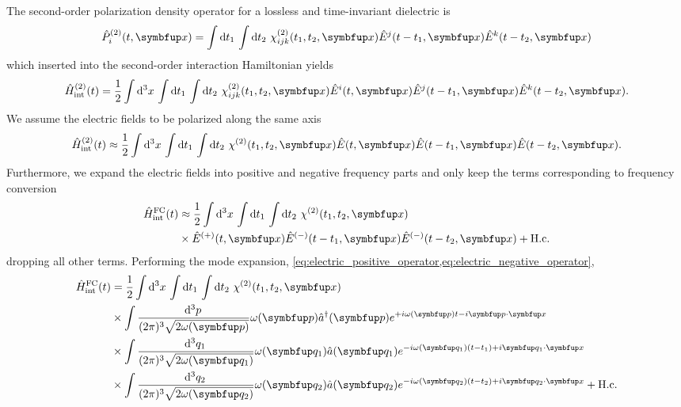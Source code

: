The second-order polarization density operator for a lossless and time-invariant dielectric is
\begin{equation}
	\hat{P}_i^{(2)}(t,\vb{x})
	=
	\int\dd{t_1}
	\int\dd{t_2}
	\chi^{(2)}_{ijk}(t_1,t_2,\vb{x})
	\hat{E}^j(t-t_1,\vb{x})
	\hat{E}^k(t-t_2,\vb{x})
\end{equation}
which inserted into the second-order interaction Hamiltonian yields
\begin{equation}
	\hat{H}_\text{int}^{(2)}(t)
	=
	\frac{1}{2}
	\int\dd[3]{x}
	\int\dd{t_1}
	\int\dd{t_2}
	\chi^{(2)}_{ijk}(t_1,t_2,\vb{x})
	\hat{E}^i(t,\vb{x})
	\hat{E}^j(t-t_1,\vb{x})
	\hat{E}^k(t-t_2,\vb{x})
	.
\end{equation}
We assume the electric fields to be polarized along the same axis
\begin{equation}
	\hat{H}_\text{int}^{(2)}(t)
	\approx
	\frac{1}{2}
	\int\dd[3]{x}
	\int\dd{t_1}
	\int\dd{t_2}
	\chi^{(2)}(t_1,t_2,\vb{x})
	\hat{E}(t,\vb{x})
	\hat{E}(t-t_1,\vb{x})
	\hat{E}(t-t_2,\vb{x})
	.
\end{equation}
Furthermore, we expand the electric fields into positive and negative frequency parts and only keep the terms corresponding to frequency conversion
\begin{equation}
	\begin{split}
		\hat{H}_\text{int}^\text{FC}(t)
		&\approx
		\frac{1}{2}
		\int\dd[3]{x}
		\int\dd{t_1}
		\int\dd{t_2}
		\chi^{(2)}(t_1,t_2,\vb{x})
		\\
		&\times
		\hat{E}^{(+)}(t,\vb{x})
		\hat{E}^{(-)}(t-t_1,\vb{x})
		\hat{E}^{(-)}(t-t_2,\vb{x})
		+
		\text{H.c.}
	\end{split}
\end{equation}
dropping all other terms.
Performing the mode expansion, \cref{eq:electric_positive_operator,eq:electric_negative_operator},
\begin{equation}
	\begin{split}
		\hat{H}_\text{int}^\text{FC}(t)
		&=
		\frac{1}{2}
		\int\dd[3]{x}
		\int\dd{t_1}
		\int\dd{t_2}
		\chi^{(2)}(t_1,t_2,\vb{x})
		\\
		&\times
		\int\frac{\dd[3]{p}}{(2\pi)^3\sqrt{2\omega(\vb{p})}}
		\omega(\vb{p})
		\hat{a}^\dagger(\vb{p})
		e^{+i\omega(\vb{p})t-i\vb{p}\vdot\vb{x}}
		\\
		&\times
		\int\frac{\dd[3]{q_1}}{(2\pi)^3\sqrt{2\omega(\vb{q}_1)}}
		\omega(\vb{q}_1)
		\hat{a}(\vb{q}_1)
		e^{-i\omega(\vb{q}_1)(t-t_1)+i\vb{q}_1\vdot\vb{x}}
		\\
		&\times
		\int\frac{\dd[3]{q_2}}{(2\pi)^3\sqrt{2\omega(\vb{q}_2)}}
		\omega(\vb{q}_2)
		\hat{a}(\vb{q}_2)
		e^{-i\omega(\vb{q}_2)(t-t_2)+i\vb{q}_2\vdot\vb{x}}
		+
		\text{H.c.}
	\end{split}
\end{equation}
